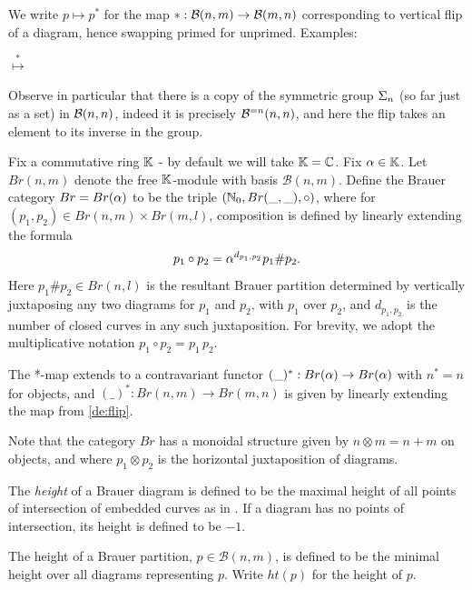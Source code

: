 \mdef  \label{de:flip}
We write $p \mapsto p^*$ for the map $*: {\mathcal B}(n,m) \rightarrow {\mathcal B}(m,n)$ corresponding to 
vertical flip of a diagram, hence swapping primed for unprimed. Examples:
\medskip 

{\centering
{}  \hspace{.32cm}$ \stackrel{*}{\mapsto}$\hspace{.32cm}  

  \hspace{1cm}   

\medskip }

Observe in particular that there is a copy of the symmetric group $\Sigma_n$ (so far just as a set) in ${\mathcal B}(n,n)$, indeed it is precisely ${\mathcal B}^{=n}(n,n)$, and here the flip takes an element to its inverse in the group. 


\mdef    \label{pa:ground-ring}
Fix a commutative ring $\mathbb{K}$ - by default we will take $\mathbb{K}=\mathbb{C}$. 
Fix $\alpha \in \mathbb{K}$. Let $Br(n,m)$ denote the free $\mathbb{K}$-module with basis 
$\mathcal{B}(n,m)$. Define the Brauer category $Br=Br(\alpha)$ to be the triple $(\mathbb{N}_{0}, Br(\_, \_), \circ )$, where for $(p_1,p_2)\in Br(n,m)\times Br(m,l)$, composition is defined by linearly extending the formula
\[p_1\circ p_2 = \alpha^{d_{p_1,p_2}} p_1\# p_2.\]
Here $p_1\# p_2 \in Br(n,l)$ is the resultant Brauer partition determined by vertically juxtaposing any two diagrams for $p_1$ and $p_2$,
with $p_1$ over $p_2$, 
and $d_{p_1,p_2}$ is the number of closed curves in any such juxtaposition. For brevity, we adopt the multiplicative notation $p_1 \circ p_2=p_1 \, p_2$. 

\mdef \label{de:flip2}
The *-map extends to a contravariant functor $(\_)^*:Br(\alpha)\to Br(\alpha)$ with $n^*=n$ for objects, and $(\_)^*:Br(n,m)\to Br(m,n)$ is given by linearly extending the map from \ref{de:flip}.

\mdef 
Note that the category $Br$ has a monoidal structure given by $n\otimes m=n+m$ on objects, and where $p_1\otimes p_2$ is the horizontal juxtaposition of diagrams. 

\mdef The {\em height} of a Brauer diagram is defined to be the maximal height of all points of intersection of embedded curves as in \cite[\S2.2]{KadarYu}. If a diagram has no points of intersection, its height is defined to be $-1$.

\mdef The height of a Brauer partition, $p\in \mathcal{B}(n,m)$, is defined to be the minimal height over all diagrams representing $p$. Write $ht(p)$ for the height of $p$.

